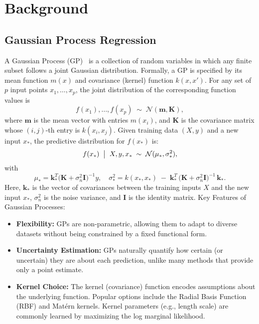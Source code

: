 \appendix
\onecolumn 
\section{Background}
\subsection{Gaussian Process Regression}
\label{appendix:gp_background}
A Gaussian Process (GP)~\cite{williams_gaussian_1996} is a collection of random variables in which any finite subset follows a joint Gaussian distribution. Formally, a GP is specified by its mean function $m(x)$ and covariance (kernel) function $k(x, x')$. For any set of $p$ input points $x_1, \dots, x_p$, the joint distribution of the corresponding function values is
\begin{equation}
    f(x_1), \dots, f(x_p) 
    \;\sim\;
    \mathcal{N}(\mathbf{m}, \mathbf{K}),
\end{equation}
where $\mathbf{m}$ is the mean vector with entries $m(x_i)$, and $\mathbf{K}$ is the covariance matrix whose $(i,j)$-th entry is $k(x_i, x_j)$. 
Given training data $(X, y)$ and a new input $x_*$, the predictive distribution for $f(x_*)$ is:
\begin{equation}
    f(x_*) \;\bigm|\; X, y, x_* 
    \;\sim\; 
    \mathcal{N}(\mu_*, \sigma_*^2),
\end{equation}
with
\[
    \mu_* 
    = \mathbf{k}_*^T \bigl(\mathbf{K} + \sigma_n^2 \mathbf{I}\bigr)^{-1} y,
    \quad
    \sigma_*^2
    = k(x_*, x_*) 
    \;-\; \mathbf{k}_*^T\,\bigl(\mathbf{K} + \sigma_n^2 \mathbf{I}\bigr)^{-1}\,\mathbf{k}_*.
\]
Here, $\mathbf{k}_*$ is the vector of covariances between the training inputs $X$ and the new input $x_*$, $\sigma_n^2$ is the noise variance, and $\mathbf{I}$ is the identity matrix.
Key Features of Gaussian Processes:
\begin{itemize}
    \item \textbf{Flexibility:}
    GPs are non-parametric, allowing them to adapt to diverse datasets without being constrained by a fixed functional form.

    \item \textbf{Uncertainty Estimation:}
    GPs naturally quantify how certain (or uncertain) they are about each prediction, unlike many methods that provide only a point estimate.

    \item \textbf{Kernel Choice:}
    The kernel (covariance) function encodes assumptions about the underlying function. Popular options include the Radial Basis Function (RBF) and Mat\'ern kernels. Kernel parameters (e.g., length scale) are commonly learned by maximizing the log marginal likelihood.
\end{itemize}

